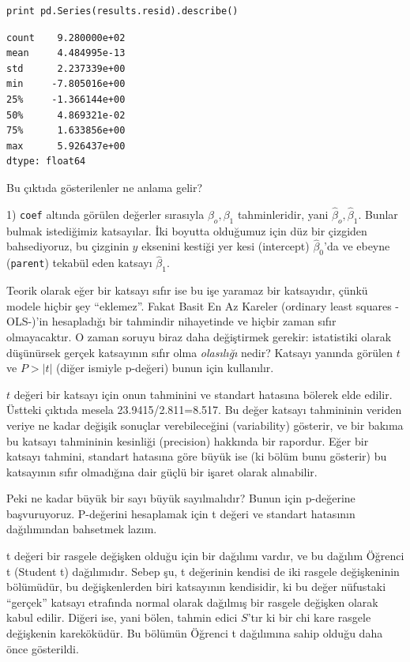 \documentclass[12pt,fleqn]{article}\usepackage{../../common}
\begin{document}
\begin{verbatim}
print pd.Series(results.resid).describe()
\end{verbatim}

\begin{verbatim}
count    9.280000e+02
mean     4.484995e-13
std      2.237339e+00
min     -7.805016e+00
25%     -1.366144e+00
50%      4.869321e-02
75%      1.633856e+00
max      5.926437e+00
dtype: float64
\end{verbatim}

Bu çıktıda gösterilenler ne anlama gelir? 

1) \verb!coef! altında görülen değerler sırasıyla $\beta_o,\beta_1$
tahminleridir, yani $\hat{\beta}_o,\hat{\beta}_1$. Bunlar bulmak istediğimiz
katsayılar.  İki boyutta olduğumuz için düz bir çizgiden bahsediyoruz, bu
çizginin $y$ eksenini kestiği yer kesi (intercept) $\hat{\beta}_0$'da ve ebeyne
(\verb!parent!)  tekabül eden katsayı $\hat{\beta}_1$.

Teorik olarak eğer bir katsayı sıfır ise bu işe yaramaz bir katsayıdır, çünkü
modele hiçbir şey ``eklemez''.  Fakat Basit En Az Kareler (ordinary least
squares -OLS-)'in hesapladığı bir tahmindir nihayetinde ve hiçbir zaman sıfır
olmayacaktır. O zaman soruyu biraz daha değiştirmek gerekir: istatistiki olarak
düşünürsek gerçek katsayının sıfır olma {\em olasılığı} nedir?  Katsayı yanında
görülen $t$ ve $P>|t|$ (diğer ismiyle p-değeri) bunun için kullanılır.

$t$ değeri bir katsayı için onun tahminini ve standart hatasına bölerek elde
edilir. Üstteki çıktıda mesela 23.9415/2.811=8.517. Bu değer katsayı tahmininin
veriden veriye ne kadar değişik sonuçlar verebileceğini (variability) gösterir,
ve bir bakıma bu katsayı tahmininin kesinliği (precision) hakkında bir
rapordur. Eğer bir katsayı tahmini, standart hatasına göre büyük ise (ki bölüm
bunu gösterir) bu katsayının sıfır olmadığına dair güçlü bir işaret olarak
alınabilir.

Peki ne kadar büyük bir sayı büyük sayılmalıdır? Bunun için p-değerine
başvuruyoruz. P-değerini hesaplamak için t değeri ve standart hatasının
dağılımından bahsetmek lazım.

t değeri bir rasgele değişken olduğu için bir dağılımı vardır, ve bu dağılım
Öğrenci t (Student t) dağılımıdır. Sebep şu, t değerinin kendisi de iki rasgele
değişkeninin bölümüdür, bu değişkenlerden biri katsayının kendisidir, ki bu
değer nüfustaki ``gerçek'' katsayı etrafında normal olarak dağılmış bir rasgele
değişken olarak kabul edilir. Diğeri ise, yani bölen, tahmin edici $S$'tır ki
bir chi kare rasgele değişkenin kareköküdür. Bu bölümün Öğrenci t dağılımına
sahip olduğu daha önce gösterildi.
\end{document}
